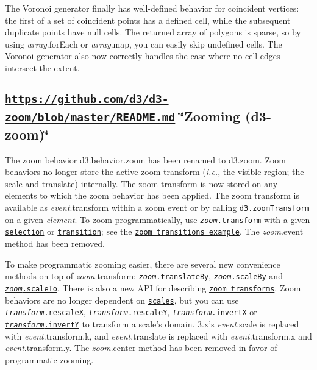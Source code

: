 The Voronoi generator finally has well-\/defined behavior for coincident vertices\+: the first of a set of coincident points has a defined cell, while the subsequent duplicate points have null cells. The returned array of polygons is sparse, so by using {\itshape array}.for\+Each or {\itshape array}.map, you can easily skip undefined cells. The Voronoi generator also now correctly handles the case where no cell edges intersect the extent.

\subsection*{\href{https://github.com/d3/d3-zoom/blob/master/README.md}{\tt https\+://github.\+com/d3/d3-\/zoom/blob/master/\+R\+E\+A\+D\+M\+E.\+md} \char`\"{}\+Zooming (d3-\/zoom)\char`\"{}}

The zoom behavior d3.\+behavior.\+zoom has been renamed to d3.\+zoom. Zoom behaviors no longer store the active zoom transform ({\itshape i.\+e.}, the visible region; the scale and translate) internally. The zoom transform is now stored on any elements to which the zoom behavior has been applied. The zoom transform is available as {\itshape event}.transform within a zoom event or by calling \href{https://github.com/d3/d3-zoom/blob/master/README.md#zoomTransform}{\tt d3.\+zoom\+Transform} on a given {\itshape element}. To zoom programmatically, use \href{https://github.com/d3/d3-zoom/blob/master/README.md#zoom_transform}{\tt {\itshape zoom}.transform} with a given \href{#selections-d3-selection}{\tt selection} or \href{#transitions-d3-transition}{\tt transition}; see the \href{https://bl.ocks.org/mbostock/b783fbb2e673561d214e09c7fb5cedee}{\tt zoom transitions example}. The {\itshape zoom}.event method has been removed.

To make programmatic zooming easier, there are several new convenience methods on top of {\itshape zoom}.transform\+: \href{https://github.com/d3/d3-zoom/blob/master/README.md#zoom_translateBy}{\tt {\itshape zoom}.translate\+By}, \href{https://github.com/d3/d3-zoom/blob/master/README.md#zoom_scaleBy}{\tt {\itshape zoom}.scale\+By} and \href{https://github.com/d3/d3-zoom/blob/master/README.md#zoom_scaleTo}{\tt {\itshape zoom}.scale\+To}. There is also a new A\+PI for describing \href{https://github.com/d3/d3-zoom/blob/master/README.md#zoom-transforms}{\tt zoom transforms}. Zoom behaviors are no longer dependent on \href{#scales-d3-scale}{\tt scales}, but you can use \href{https://github.com/d3/d3-zoom/blob/master/README.md#transform_rescaleX}{\tt {\itshape transform}.rescaleX}, \href{https://github.com/d3/d3-zoom/blob/master/README.md#transform_rescaleY}{\tt {\itshape transform}.rescaleY}, \href{https://github.com/d3/d3-zoom/blob/master/README.md#transform_invertX}{\tt {\itshape transform}.invertX} or \href{https://github.com/d3/d3-zoom/blob/master/README.md#transform_invertY}{\tt {\itshape transform}.invertY} to transform a scale’s domain. 3.\+x’s {\itshape event}.scale is replaced with {\itshape event}.transform.\+k, and {\itshape event}.translate is replaced with {\itshape event}.transform.\+x and {\itshape event}.transform.\+y. The {\itshape zoom}.center method has been removed in favor of programmatic zooming.

